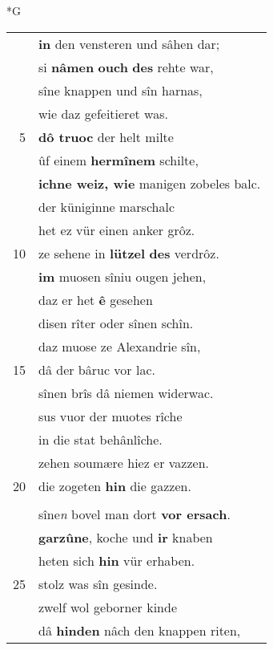 \documentclass[8pt,a4paper,notitlepage]{article}
\begin{document}
\begin{table}[ht]
\begin{minipage}[t]{0.5\linewidth}
\small
\begin{center}*G
\end{center}
\begin{tabular}{rl}
 & \textbf{in} den vensteren und sâhen dar;\\ 
 & si \textbf{nâmen} \textbf{ouch} \textbf{des} rehte war,\\ 
 & sîne knappen und sîn harnas,\\ 
 & wie daz gefeitieret was.\\ 
5 & \textbf{dô truoc} der helt milte\\ 
 & ûf einem \textbf{hermînem} schilte,\\ 
 & \textbf{ichne weiz, wie} manigen zobeles balc.\\ 
 & der küniginne marschalc\\ 
 & het ez vür einen anker grôz.\\ 
10 & ze sehene in \textbf{lützel} \textbf{des} verdrôz.\\ 
 & \textbf{im} muosen sîniu ougen jehen,\\ 
 & daz er het \textbf{ê} gesehen\\ 
 & disen rîter oder sînen schîn.\\ 
 & daz muose ze Alexandrie sîn,\\ 
15 & dâ der bâruc vor lac.\\ 
 & sînen brîs dâ niemen widerwac.\\ 
 & sus vuor der muotes rîche\\ 
 & in die stat behânlîche.\\ 
 & zehen soumære hiez er vazzen.\\ 
20 & die zogeten \textbf{hin} die gazzen.\\ 
 & \textbf{\begin{large}D\end{large}en} riten zweinzic knappen nâch.\\ 
 & sîne\textit{n} bovel man dort \textbf{vor ersach}.\\ 
 & \textbf{garzûne}, koche und \textbf{ir} knaben\\ 
 & heten sich \textbf{hin} vür erhaben.\\ 
25 & stolz was sîn gesinde.\\ 
 & zwelf wol geborner kinde\\ 
 & dâ \textbf{hinden} nâch den knappen riten,\\ 

\end{tabular}
\end{minipage}
\end{table}
\end{document}
